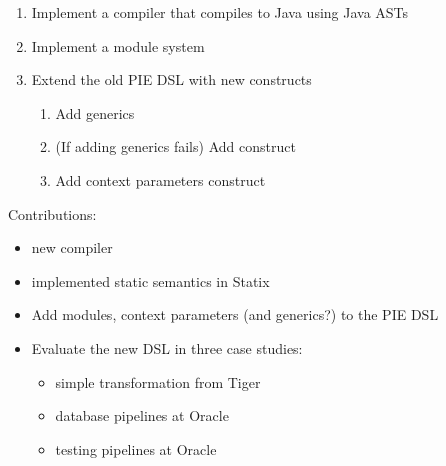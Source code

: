 \begin{enumerate}
  \item Implement a compiler that compiles to Java using Java ASTs
  \item Implement a module system
  \item Extend the old PIE DSL with new constructs
  \begin{enumerate}
    \item Add generics
    \item (If adding generics fails) Add  construct
    \item Add context parameters construct
  \end{enumerate}
\end{enumerate}

Contributions:
\begin{itemize}
  \item new compiler
  \item implemented static semantics in Statix
  \item Add modules, context parameters (and generics?) to the PIE DSL
  \item Evaluate the new DSL in three case studies:
  \begin{itemize}
    \item simple transformation from Tiger
    \item database pipelines at Oracle
    \item testing pipelines at Oracle
  \end{itemize}
\end{itemize}
